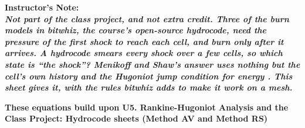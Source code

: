 \documentclass[11pt,addpoints]{exam}
\begin{document}
\noindent
\bf{Instructor's Note:}\normalfont\\

\noindent
\it{Not part of the class project, and not extra credit. Three of the burn models in bitwhiz, the course's open-source hydrocode, need the pressure of the first shock to reach each cell, and burn only after it arrives. A hydrocode smears every shock over a few cells, so which state is ``the shock''? Menikoff and Shaw's answer uses nothing but the cell's own history and the Hugoniot jump condition for energy \cite{menikoff2010}. This sheet gives it, with the rules bitwhiz adds to make it work on a mesh.}\normalfont\vspace{1.5em}

\textbf{These equations build upon U5. Rankine-Hugoniot Analysis and the Class Project: Hydrocode sheets (Method AV and Method RS)}\vspace{1em}
\end{document}
